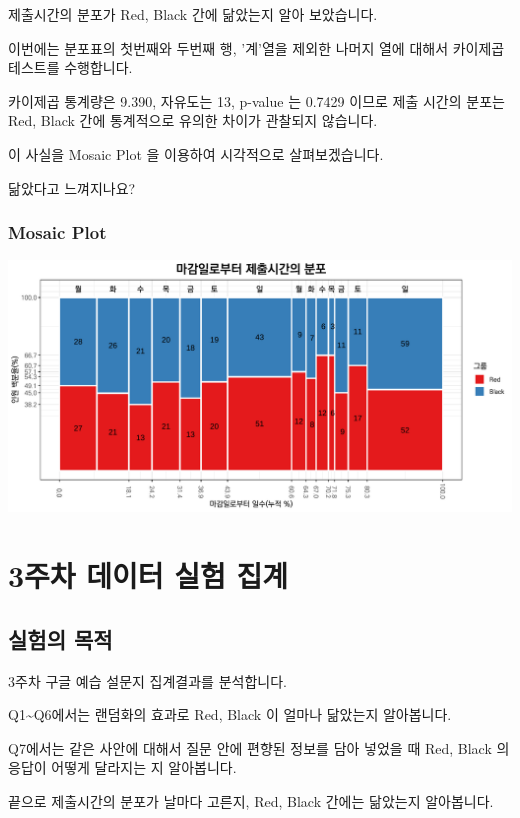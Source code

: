 \documentclass[
]{book}
\begin{document}
제출시간의 분포가 Red, Black 간에 닮았는지 알아 보았습니다.

이번에는 분포표의 첫번째와 두번째 행, '계'열을 제외한 나머지 열에 대해서 카이제곱테스트를 수행합니다.

카이제곱 통계량은 9.390, 자유도는 13, p-value 는 0.7429 이므로 제출 시간의 분포는 Red, Black 간에 통계적으로 유의한 차이가 관찰되지 않습니다.

이 사실을 Mosaic Plot 을 이용하여 시각적으로 살펴보겠습니다.

닮았다고 느껴지나요?

\subsection{Mosaic Plot}\label{mosaic-plot-3}

\includegraphics{Quiz_report_2025_files/figure-latex/unnamed-chunk-42-1.pdf}

\chapter{3주차 데이터 실험 집계}\label{uxc8fcuxcc28-uxb370uxc774uxd130-uxc2e4uxd5d8-uxc9d1uxacc4-2}

\section{실험의 목적}\label{uxc2e4uxd5d8uxc758-uxbaa9uxc801-2}

3주차 구글 예습 설문지 집계결과를 분석합니다.

Q1\textasciitilde Q6에서는 랜덤화의 효과로 Red, Black 이 얼마나 닮았는지 알아봅니다.

Q7에서는 같은 사안에 대해서 질문 안에 편향된 정보를 담아 넣었을 때 Red, Black 의 응답이 어떻게 달라지는 지 알아봅니다.

끝으로 제출시간의 분포가 날마다 고른지, Red, Black 간에는 닮았는지 알아봅니다.
\end{document}
